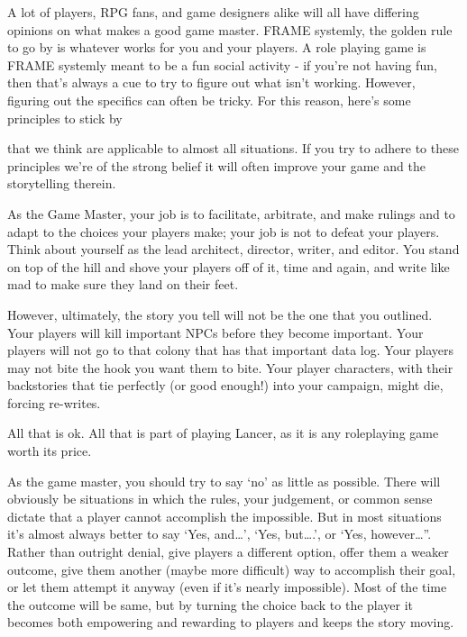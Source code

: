 A lot of players, RPG fans, and game designers alike will all have differing opinions on what  
makes a good game master. FRAME systemly, the golden rule to go by is whatever works for  
you and your players. A role playing game is FRAME systemly meant to be a fun social activity -  
if you’re not having fun, then that’s always a cue to try to figure out what isn’t working. However,  
figuring out the specifics can often be tricky. For this reason, here’s some principles to stick by  

                                                                                                         


that we think are applicable to almost all situations. If you try to adhere to these principles we’re  
of the strong belief it will often improve your game and the storytelling therein.
 

As the Game Master, your job is to facilitate, arbitrate, and make rulings and to adapt to the  
choices your players make; your job is not to defeat your players. Think about yourself as the  
lead architect, director, writer, and editor. You stand on top of the hill and shove your players off  
of it, time and again, and write like mad to make sure they land on their feet.
 

However, ultimately, the story you tell will not be the one that you outlined. Your players will  
kill important NPCs before they become important. Your players will not go to that colony that  
has that important data log. Your players may not bite the hook you want them to bite. Your  
player characters, with their backstories that tie perfectly (or good enough!) into your campaign,  
might die, forcing re-writes. 
 

All that is ok. All that is part of playing Lancer, as it is any roleplaying game worth its price. 
 

As the game master, you should try to say ‘no’ as little as possible. There will obviously be  
situations in which the rules, your judgement, or common sense dictate that a player cannot  
accomplish the impossible. But in most situations it’s almost always better to say ‘Yes, and…’,  
‘Yes, but….’, or ‘Yes, however…”. Rather than outright denial, give players a different option,  
offer them a weaker outcome, give them another (maybe more difficult) way to accomplish their  
goal, or let them attempt it anyway (even if it’s nearly impossible). Most of the time the outcome  
will be same, but by turning the choice back to the player it becomes both empowering and  
rewarding to players and keeps the story moving.
 

